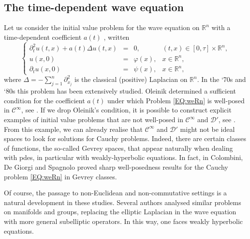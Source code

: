 \documentclass[12pt,oneside,a4paper]{book}
\numberwithin{equation}{section}     %
\theoremstyle{plain}
\theoremstyle{definition}
\newcommand{\R}{{\mathbb R}}
\newcommand{\Rn}{{\R}^n}
\begin{document}
\subsection{The time-dependent wave equation}\label{SEC:intWE}

Let us consider the initial value problem for the wave equation on $\Rn$ with a time-dependent coefficient $a(t)$ , written
\begin{equation}\label{EQ:weRn}
\left\{\begin{array}{rclc}
\partial ^2_{t}u(t,x)+a(t) \Delta u(t,x)	&=&0,			&(t,x)\in [0,\tau]\times\Rn,\\
u(x,0)	&=&\varphi(x),	&x\in\Rn,\\
\partial _t u(x,0)	&=&\psi(x),		&x\in\Rn,
\end{array}\right.
\end{equation}  
where $\Delta=-\sum_{j=1}^n\partial ^2_{x_j}$ is the classical (positive) Laplacian on $\Rn$. In the `70s and `80s this problem has been extensively studied. Oleinik determined a sufficient condition for the coefficient $a(t)$ under which Problem \eqref{EQ:weRn} is well-posed in $\mathcal{C}^\infty$, see \cite{O1970}. If we drop Oleinik's condition, it is possible to construct explicit examples of initial value problems that are not well-posed in $\mathcal{C}^\infty$ and $\mathcal{D}'$, see \cite{CS1982, Colombini-Jannelli-Spagnolo:Annals-low-reg}. From this example, we can already realise that $\mathcal{C}^\infty$ and $\mathcal{D}'$ might not be ideal spaces to look for solutions for Cauchy problems. Indeed, there are certain classes of functions, the so-called Gevrey spaces, that appear naturally when dealing with pdes, in particular with weakly-hyperbolic equations. In fact, in \cite{CDS79} Colombini, De Giorgi and Spagnolo proved sharp well-posedness results for the Cauchy problem \eqref{EQ:weRn} in Gevrey classes.

Of course, the passage to non-Euclidean and non-commutative settings is a natural development in these studies. Several authors analysed similar problems on manifolds and groups, replacing the elliptic Laplacian in the wave equation with more general subelliptic operators. In this way, one faces weakly hyperbolic equations.
\end{document}

